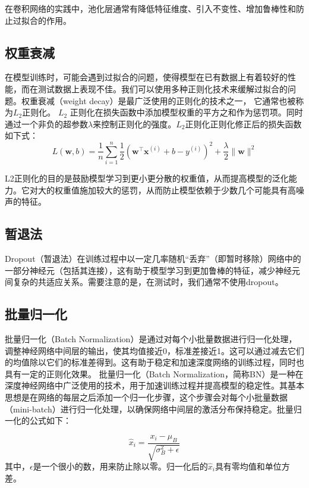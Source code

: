 在卷积网络的实践中，池化层通常有降低特征维度、引入不变性、增加鲁棒性和防止过拟合的作用。

\subsection{权重衰减}
在模型训练时，可能会遇到过拟合的问题，使得模型在已有数据上有着较好的性能，而在测试数据上表现不佳。我们可以使用多种正则化技术来缓解过拟合的问题。权重衰减（weight decay）\cite{2012L2RegularizationLearningKernels}是最广泛使用的正则化的技术之一， 它通常也被称为$L_2$正则化。
$L_2$ 正则化在损失函数中添加模型权重的平方之和作为惩罚项。同时通过一个非负的超参数$\lambda$来控制正则化的强度。$L_2$正则化正则化修正后的损失函数如下式：
\begin{equation}
  L(\mathbf{w}, b)=\frac{1}{n} \sum_{i=1}^{n} \frac{1}{2}\left(\mathbf{w}^{\top} \mathbf{x}^{(i)}+b-y^{(i)}\right)^{2}+\frac{\lambda}{2}\|\mathbf{w}\|^{2}
\end{equation}

L2正则化的目的是鼓励模型学习到更小更分散的权重值，从而提高模型的泛化能力。它对大的权重值施加较大的惩罚，从而防止模型依赖于少数几个可能具有高噪声的特征。

\subsection{暂退法}
Dropout（暂退法）\cite{2012Improvingneuralnetworkspreventingcoadaptationfeaturedetectors}在训练过程中以一定几率随机“丢弃”（即暂时移除）网络中的一部分神经元（包括其连接），这有助于模型学习到更加鲁棒的特征，减少神经元间复杂的共适应关系。需要注意的是，在测试时，我们通常不使用dropout。
\subsection{批量归一化}
批量归一化（Batch Normalization）\cite{2015BatchNormalizationAcceleratingDeepNetworkTrainingReducingInternalCovariateShift}是通过对每个小批量数据进行归一化处理，调整神经网络中间层的输出，使其均值接近0，标准差接近1。这可以通过减去它们的均值除以它们的标准差得到。这有助于稳定和加速深度网络的训练过程，同时也具有一定的正则化效果。
批量归一化（Batch Normalization，简称BN）是一种在深度神经网络中广泛使用的技术，用于加速训练过程并提高模型的稳定性。其基本思想是在网络的每层之后添加一个归一化步骤，这个步骤会对每个小批量数据（mini-batch）进行归一化处理，以确保网络中间层的激活分布保持稳定。批量归一化的公式如下：

\begin{equation}
  \hat{x}_i = \frac{x_i - \mu_B}{\sqrt{\sigma_B^2 + \epsilon}} 
\end{equation}
其中，$\epsilon$是一个很小的数，用来防止除以零。归一化后的\(\hat{x}_i\)具有零均值和单位方差。

